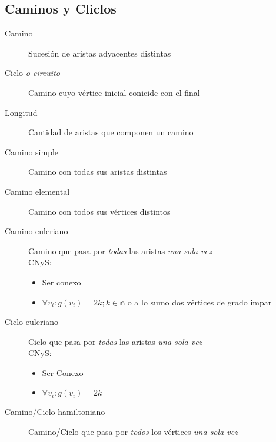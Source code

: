\documentclass[a4paper]{article}
\numberwithin{equation}{section}
\numberwithin{figure}{section}
\numberwithin{table}{section}
\newcommand{\refa}[1]{}
\begin{document}
\subsection{Caminos y Cliclos}
\begin{description}
	\item[Camino]\label{camino} Sucesi\'on de aristas adyacentes\refa{adyacente} distintas
    \item[Ciclo \emph{o circuito}]\label{ciclo} Camino\refa{camino} cuyo v\'ertice inicial conicide con el final
    \item[Longitud] Cantidad de aristas que componen un camino\refa{camino}
    \item[Camino simple]\label{camino simple} Camino\refa{camino} con todas sus aristas distintas
   \item[Camino elemental] Camino\refa{camino} con todos sus v\'ertices distintos
   \item[Camino euleriano] Camino\refa{camino} que pasa por \emph{todas} las aristas \emph{una sola vez}
    	\\ CNyS:
        	\begin{itemize}
            	\item Ser conexo\refa{conexo}
                \item $\forall v_i : g(v_i) = 2k; k \in \mathbb{n}$ o a lo sumo dos v\'ertices de grado\refa{grado} impar
            \end{itemize}
   \item[Ciclo euleriano] Ciclo\refa{ciclo} que pasa por \emph{todas} las aristas \emph{una sola vez}
        	\\ CNyS:
        	\begin{itemize}
            	\item Ser Conexo\refa{conexo}
                \item $\forall v_i : g(v_i) = 2k$
            \end{itemize}
	\item[Camino/Ciclo hamiltoniano] Camino\refa{camino}/Ciclo\refa{ciclo} que pasa por \emph{todos} los v\'ertices \emph{una sola vez}   
\end{description}
\end{document}
